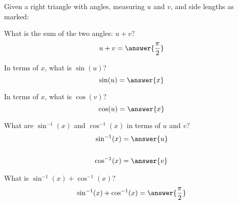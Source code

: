 \documentclass{ximera}
\author{Bobby Ramsey}
\begin{document}
Given a right triangle with angles, measuring $u$ and $v$, and side lengths as marked:
\begin{image}[2in]
\end{image}

\begin{exercise}
	What is the sum of the two angles: $u + v$?
	\[ u + v = \answer{\frac{\pi}{2}} \]
	\begin{exercise}
		In terms of $x$, what is $\sin(u)$?
		\[ \sin(u) = \answer{x} \]
		\begin{exercise}
			In terms of $x$, what is $\cos(v)$?
			\[ \cos(u) = \answer{x} \]
			\begin{exercise}
				What are $\sin^{-1}(x)$ and $\cos^{-1}(x)$ in terms of $u$ and $v$?
				\begin{align*}
					\sin^{-1}(x) &= \answer{u} \\ \\
					\cos^{-1}(x) &= \answer{v}
				\end{align*}
				\begin{exercise}
					What is $\sin^{-1}(x) + \cos^{-1}(x)$?
					\[  \sin^{-1}(x) + \cos^{-1}(x) = \answer{\frac{\pi}{2}} \]
				\end{exercise}
			\end{exercise}
		\end{exercise}
	\end{exercise}
\end{exercise}
\end{document}
